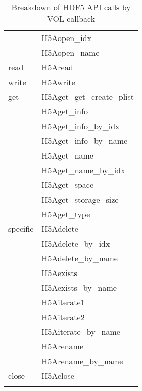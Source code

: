 \begin{longtable}{ |l|>{\raggedright\arraybackslash}l| }
         & H5Aopen\_idx \\
         & H5Aopen\_name \\
    \hline
    read & H5Aread \\
    \hline
    write & H5Awrite \\
    \hline
    get & H5Aget\_get\_create\_plist \\
        & H5Aget\_info \\
        & H5Aget\_info\_by\_idx \\
        & H5Aget\_info\_by\_name \\
        & H5Aget\_name \\
        & H5Aget\_name\_by\_idx \\
        & H5Aget\_space \\
        & H5Aget\_storage\_size \\
        & H5Aget\_type \\
    \hline
    specific & H5Adelete \\
             & H5Adelete\_by\_idx \\
             & H5Adelete\_by\_name \\
             & H5Aexists \\
             & H5Aexists\_by\_name \\
             & H5Aiterate1 \\
             & H5Aiterate2 \\
             & H5Aiterate\_by\_name \\
             & H5Arename \\
             & H5Arename\_by\_name \\
    \hline
    close & H5Aclose \\
    \hline
\caption{Breakdown of HDF5 API calls by VOL callback}
\end{longtable}


